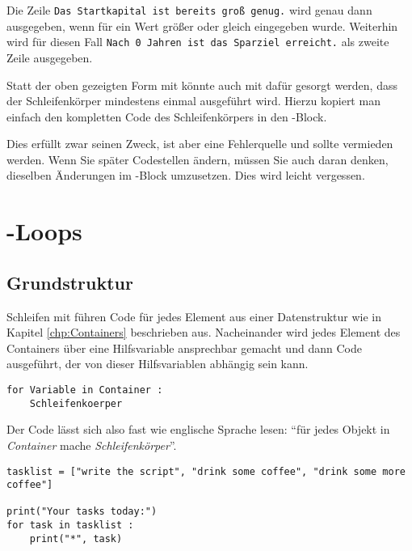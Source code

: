 Die Zeile \texttt{Das Startkapital ist bereits groß genug.} wird genau dann ausgegeben, wenn für  ein Wert größer oder gleich  eingegeben wurde. Weiterhin wird für diesen Fall \texttt{Nach 0 Jahren ist das Sparziel erreicht.} als zweite Zeile ausgegeben.

\begin{warnbox}
Statt der oben gezeigten Form mit  könnte auch mit  dafür gesorgt werden, dass der Schleifenkörper mindestens einmal ausgeführt wird. Hierzu kopiert man einfach den kompletten Code des Schleifenkörpers in den -Block.

Dies erfüllt zwar seinen Zweck, ist aber eine Fehlerquelle und sollte vermieden werden. Wenn Sie später Codestellen ändern, müssen Sie auch daran denken, dieselben Änderungen im -Block umzusetzen. Dies wird leicht vergessen.
\end{warnbox}

    
\section{-Loops}
\subsection{Grundstruktur}
Schleifen mit  führen Code für jedes Element aus einer Datenstruktur wie in Kapitel \ref{chp:Containers} beschrieben aus. Nacheinander wird jedes Element des Containers über eine Hilfsvariable ansprechbar gemacht und dann Code ausgeführt, der von dieser Hilfsvariablen abhängig sein kann.

\begin{codebox}
\begin{verbatim}
for Variable in Container :
    Schleifenkoerper
\end{verbatim}
\end{codebox}

Der Code lässt sich also fast wie englische Sprache lesen: \enquote{für jedes Objekt in \emph{Container} mache \emph{Schleifenkörper}}.

\begin{codebox}
\begin{verbatim}
tasklist = ["write the script", "drink some coffee", "drink some more coffee"]

print("Your tasks today:")
for task in tasklist :
    print("*", task)
\end{verbatim}
\end{codebox}

